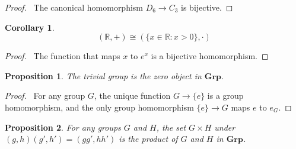 \documentclass{book}
\let\qed\relax
\newtheorem{prop}{Proposition}[chapter]
\newtheorem{cor}{Corollary}[prop]
\theoremstyle{definition}
\begin{document}
\begin{proof}
    \pf\ The canonical homomorphism $D_6 \rightarrow C_3$ is bijective. \qed
\end{proof}

\begin{cor}
    \[ (\mathbb{R}, +) \cong (\{ x \in \mathbb{R} : x > 0 \}, \cdot) \]
\end{cor}

\begin{proof}
    \pf\ The function that maps $x$ to $e^x$ is a bijective homomorphism. \qed
\end{proof}

\begin{prop}
    The trivial group is the zero object in $\mathbf{Grp}$.
\end{prop}

\begin{proof}
    \pf\ For any group $G$, the unique function $G \rightarrow \{e\}$ is a group homomorphism, and the only group homomorphism $\{e\} \rightarrow G$ maps $e$ to $e_G$. \qed
\end{proof}

\begin{prop}
    For any groups $G$ and $H$, the set $G \times H$ under $(g,h)(g',h') = (gg',hh')$ is the product of $G$ and $H$ in $\mathbf{Grp}$.
\end{prop}
\end{document}

